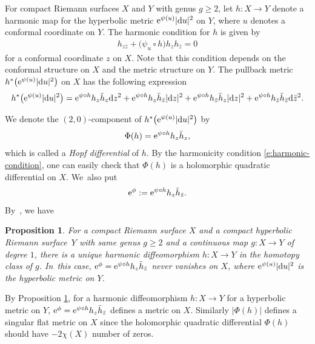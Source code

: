 \documentclass[pdftex]{sigma}%
\numberwithin{equation}{section}
\newtheorem{Proposition}[Theorem]{Proposition}
 { \theoremstyle{definition}
\newtheorem{Remark}[Theorem]{Remark} }
\begin{document}
For compact Riemann surfaces $X$ and $Y$ with genus $g\geq 2$, let $h\colon X\to Y$ denote a harmonic map for the hyperbolic metric ${\rm e}^{\psi(u)} |{\rm d}u|^2$ on $Y$, where $u$ denotes a conformal coordinate on $Y$.
The harmonic condition for $h$ is given by
\begin{gather}\label{e:harmonic-condition}
h_{z\bar{z}}+\big(\psi_u\circ h \big) h_z h_{\bar{z}}=0
\end{gather}
for a conformal coordinate $z$ on $X$.
Note that this condition depends on the conformal structure on $X$ and the metric structure on $Y$.
The pullback metric $h^*\big( {\rm e}^{\psi(u)} |{\rm d}u|^2\big)$ on $X$ has the following expression
\begin{gather}\label{e:pullback-metric}
h^*\big( {\rm e}^{\psi(u)} |{\rm d}u|^2\big) = {\rm e}^{\psi\circ h} h_z \bar{h}_z {\rm d}z^2 + {\rm e}^{\psi\circ h} h_z \bar{h}_{\bar{z}} |{\rm d}z|^2 + {\rm e}^{\psi\circ h} h_{\bar{z}} \bar{h}_z |{\rm d}z|^2 + {\rm e}^{\psi\circ h} h_{\bar{z}} \bar{h}_{\bar{z}} {\rm d}\bar{z}^2.
\end{gather}

We denote the $(2,0)$-component of $h^*\big( {\rm e}^{\psi(u)} |{\rm d}u|^2\big)$ by
\begin{gather*}
\Phi(h)={\rm e}^{\psi\circ h} h_z \bar{h}_z,
\end{gather*}
which is called a \emph{Hopf differential} of $h$. By the harmonicity condition \eqref{e:harmonic-condition}, one can easily check that $\Phi(h)$ is a holomorphic quadratic differential on $X$. We~also put
\begin{gather*}%
{\rm e}^{\phi}:= {\rm e}^{\psi\circ h} h_z \bar{h}_{\bar{z}}.
\end{gather*}
By~\cite[Theorem 3.10.1 and Corollary 3.10.1]{J}, we have

\begin{Proposition}\label{p:property-har}
For a compact Riemann surface $X$ and a compact hyperbolic Riemann surface~$Y$ with same genus $g\ge 2$ and a continuous map $g\colon X\to Y$ of degree $1$,
there is a unique harmonic diffeomorphism $h\colon X\to Y$ in the homotopy class of $g$. In~this case,
${\rm e}^{\phi}= {\rm e}^{\psi\circ h} h_z \bar{h}_{\bar{z}}$ never vanishes on $X$, where ${\rm e}^{\psi(u)} |{\rm d}u|^2$ is the hyperbolic metric on $Y$.
\end{Proposition}

By Proposition \ref{p:property-har}, for a harmonic diffeomorphism $h\colon X\to Y$ for a hyperbolic metric on $Y$, ${\rm e}^\phi={\rm e}^{\psi\circ h} h_z \bar{h}_{\bar{z}}$ defines a metric on $X$.
Similarly $|\Phi(h)|$ defines a singular flat metric on $X$ since the holomorphic quadratic differential $\Phi(h)$ should have $-2\chi(X)$ number of zeros.
\end{document}
